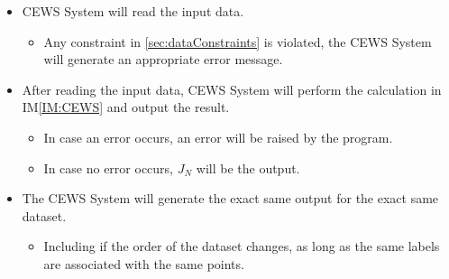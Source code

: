 \documentclass[12pt]{article}
\newcommand{\iref}[1]{IM\ref{#1}}
\newcounter{reqnum} %
\begin{document}
\noindent \begin{itemize}

\item[R\refstepcounter{reqnum}\thereqnum \label{R:inputs}:] CEWS System will read the input data.
\begin{itemize}
    \item Any constraint in \ref{sec:dataConstraints} is violated, the CEWS System will generate an appropriate error message. 
\end{itemize}

    


\item[R\refstepcounter{reqnum}\thereqnum \label{R:calculate}:] After reading the input data, CEWS System will perform the calculation in \iref{IM:CEWS} and output the result.
\begin{itemize}
    \item In case an error occurs, an error will be raised by the program.
    \item In case no error occurs, $J_N$ will be the output.
\end{itemize}



\item[R\refstepcounter{reqnum}\thereqnum \label{R:repro}:] The CEWS System will generate the exact same output for the exact same dataset.
\begin{itemize}
    \item Including if the order of the dataset changes, as long as the same labels are associated with the same points.
\end{itemize}

\end{itemize}
\end{document}
